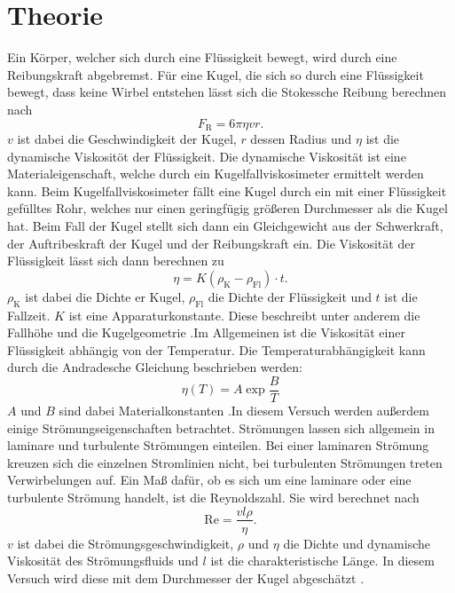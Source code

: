 \section{Theorie}
Ein Körper, welcher sich durch eine Flüssigkeit bewegt, wird durch eine Reibungskraft abgebremst. Für eine Kugel, die sich so durch eine Flüssigkeit bewegt, dass keine Wirbel 
entstehen lässt sich die Stokessche Reibung berechnen nach
\begin{equation}
    F_\text{R} = 6 \pi \eta v r .
\end{equation}
$v$ ist dabei die Geschwindigkeit der Kugel, $r$ dessen Radius und $\eta$ ist die dynamische Viskositöt der Flüssigkeit. Die dynamische Viskosität ist eine Materialeigenschaft, 
welche durch ein Kugelfallviskosimeter ermittelt werden kann. Beim Kugelfallviskosimeter fällt eine Kugel durch ein mit einer Flüssigkeit gefülltes Rohr, welches nur einen 
geringfügig größeren Durchmesser als die Kugel hat. Beim Fall der Kugel stellt sich dann ein Gleichgewicht aus der Schwerkraft, der Auftribeskraft der Kugel und der Reibungskraft 
ein. Die Viskosität der Flüssigkeit lässt sich dann berechnen zu
\begin{equation}
    \label{eq:viskositaet}
    \eta = K (\rho_\text{K} - \rho_\text{Fl}) \cdot t .
\end{equation}
$\rho_\text{K}$ ist dabei die Dichte er Kugel, $\rho_\text{Fl}$ die Dichte der Flüssigkeit und $t$ ist die Fallzeit. $K$ ist eine Apparaturkonstante. Diese beschreibt unter anderem 
die Fallhöhe und die Kugelgeometrie \cite{V207}.Im Allgemeinen ist die Viskosität einer Flüssigkeit abhängig von der Temperatur. Die Temperaturabhängigkeit kann durch die Andradesche Gleichung beschrieben werden:
\begin{equation}
    \label{eq:andradescheGl}
    \eta (T) = A \exp{\frac{B}{T}}
\end{equation}
$A$ und $B$ sind dabei Materialkonstanten \cite{V207}.In diesem Versuch werden außerdem einige Strömungseigenschaften betrachtet. Strömungen lassen sich allgemein in laminare und turbulente Strömungen einteilen. Bei einer 
laminaren Strömung kreuzen sich die einzelnen Stromlinien nicht, bei turbulenten Strömungen treten Verwirbelungen auf. Ein Maß dafür, ob es sich um eine laminare oder eine 
turbulente Strömung handelt, ist die Reynoldszahl. Sie wird berechnet nach
\begin{equation}
    \label{eq:reynold}
    \text{Re} = \frac{v l \rho}{\eta}.
\end{equation}
$v$ ist dabei die Strömungsgeschwindigkeit, $\rho$ und $\eta$ die Dichte und dynamische Viskosität des Strömungsfluids und $l$ ist die charakteristische Länge. In diesem Versuch
 wird diese mit dem Durchmesser der Kugel abgeschätzt \cite{V207}.